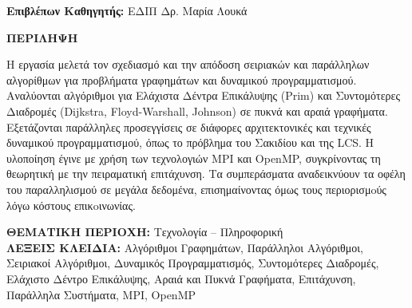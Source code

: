 \documentclass[12pt,a4paper]{article} %
\begin{document}
\begin{flushleft}
\hspace*{1.0cm}\textbf{Επιβλέπων Καθηγητής:} ΕΔΙΠ Δρ. Μαρία Λουκά 
\end{flushleft}

\clearpage %

\thispagestyle{empty}

\begin{center}
    \vspace*{1.5cm}
    \textbf{\large ΠΕΡΙΛΗΨΗ}\\[1.0cm]
\end{center}

\begin{sloppypar}
Η εργασία μελετά τον σχεδιασμό και την απόδοση σειριακών και παράλληλων αλγορίθμων για προβλήματα γραφημάτων και δυναμικού προγραμματισμού. Αναλύονται αλγόριθμοι για Ελάχιστα Δέντρα Επικάλυψης (Prim) και Συντομότερες Διαδρομές (Dijkstra, Floyd-Warshall, Johnson) σε πυκνά και αραιά γραφήματα. Εξετάζονται παράλληλες προσεγγίσεις σε διάφορες αρχιτεκτονικές και τεχνικές δυναμικού προγραμματισμού, όπως το πρόβλημα του Σακιδίου και της LCS. Η υλοποίηση έγινε με χρήση των τεχνολογιών MPI και OpenMP, συγκρίνοντας τη θεωρητική με την πειραματική επιτάχυνση. Τα συμπεράσματα αναδεικνύουν τα οφέλη του παραλληλισμού σε μεγάλα δεδομένα, επισημαίνοντας όμως τους περιορισμoύς λόγω κόστους επικoινωνίας.
\end{sloppypar}
\vfill %

\begin{sloppypar}
\noindent \textbf{ΘΕΜΑΤΙΚΗ ΠΕΡΙΟΧΗ:} Τεχνολογία – Πληροφορική\\[0.4cm]
\noindent \textbf{ΛΕΞΕΙΣ ΚΛΕΙΔΙΑ:} Αλγόριθμοι Γραφημάτων, Παράλληλοι Αλγόριθμοι, Σειριακοί Αλγόριθμοι, Δυναμικός Προγραμματισμός, Συντομότερες Διαδρομές, Ελάχιστο Δέντρο Επικάλυψης, Αραιά και Πυκνά Γραφήματα, Επιτάχυνση, Παράλληλα Συστήματα, MPI, OpenMP
\end{sloppypar}
\clearpage %

\thispagestyle{empty}
\end{document}
